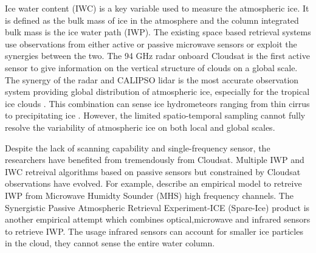 \documentclass[amt, manuscript]{copernicus}
\begin{document}
Ice water content (IWC)  is a key variable used to measure the atmospheric ice. It is defined as the bulk mass of ice in the atmosphere and the column integrated bulk mass is the ice water path (IWP). The existing space based retrieval systems use observations from either active or passive microwave sensors or exploit the synergies between the two. The 94\,\,GHz radar onboard Cloudsat is the first active sensor to give information on the vertical structure of clouds on a global scale. The synergy of the radar and CALIPSO lidar is the most accurate observation system providing global distribution of atmospheric ice, especially for the tropical ice clouds \citep{protat:theev:10}. This combination can sense ice hydrometeors ranging from thin cirrus to precipitating ice \citep{stephens:cloud:18}. However, the limited spatio-temporal sampling cannot fully resolve the  variability of atmospheric ice on both local and global scales.

Despite the lack of scanning capability and single-frequency sensor, the researchers have benefited from tremendously from Cloudsat. Multiple IWP and IWC retreival algorithms based on passive sensors but constrained by Cloudsat observations have evolved. For example, \citet{gong:cloud:14} describe an empirical model to retreive IWP from Microwave Humidty Sounder (MHS) high frequency channels. The Synergistic Passive Atmospheric Retrieval Experiment-ICE (Spare-Ice) product \citet{holl:spare:14} is another empirical attempt which combines optical,microwave and infrared sensors to retrieve IWP. The usage infrared sensors can account for smaller ice particles in the cloud, they cannot sense the entire water column. 
\end{document}
